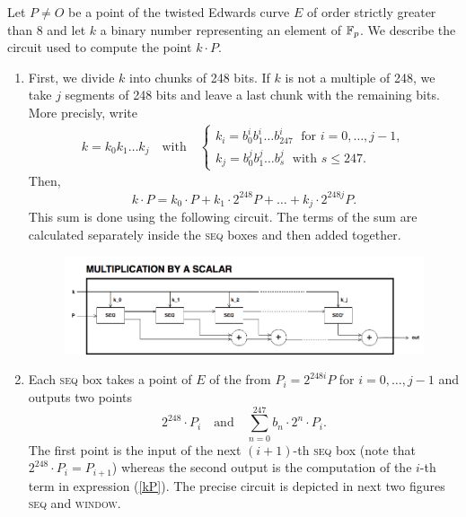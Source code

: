 Let $P\not= O$ be a point of the twisted Edwards curve $E$ of order strictly greater than 8 and let $k$ a binary number representing an element of $\mathbb{F}_p$. We describe the circuit used to compute the point $k\cdot P$.

\begin{enumerate}
	
	\item First, we divide $k$ into chunks of 248 bits. If $k$ is not a multiple of 248, we take $j$ segments of 248 bits and leave a last chunk with the remaining bits. More precisly, write 
		\begin{gather*}
		k = k_0 k_1 \dots k_j 	\quad\text{with}\quad 
			\begin{cases}
			k_i = b^i_0 b^i_1 \dots b^i_{247} 	\;\text{ for }  i = 0, \dots, j-1, \\
			k_j = b^j_0 b^j_1 \dots b^j_s 	\;\text{ with } s\leq 247.
			\end{cases}
		\end{gather*}
	Then,  
		\begin{equation}
		\label{kP}
			k\cdot P = k_0\cdot P + k_1\cdot 2^{248}P +\dots+ k_j\cdot 2^{248j}P. 	
 		\end{equation}
	This sum is done using the following circuit. 
	The terms of the sum are calculated separately inside the \textsc{seq} boxes and then added together. 

	\begin{figure}[h]
		\centering
		\includegraphics[scale=0.45]{figures/multiplication.png}
	\end{figure}
	
	\item Each \textsc{seq} box takes a point of $E$ of the from $P_i = 2^{248 i} P$ for $i=0,\dots,j-1$ and outputs two points %
		$$ 	
			2^{248} \cdot P_i 
			\quad \text{and} \quad
			\sum_{n = 0}^{247} b_n \cdot 2^{n} \cdot P_i. 
		$$
	The first point is the input of the next $(i+1)$-th \textsc{seq} box (note that $ 2^{248} \cdot P_i = P_{i+1}$) whereas the second output is the computation of the $i$-th term in expression (\ref{kP}). The precise circuit is depicted in next two figures \textsc{seq} and \textsc{window}.
	

\end{enumerate}
